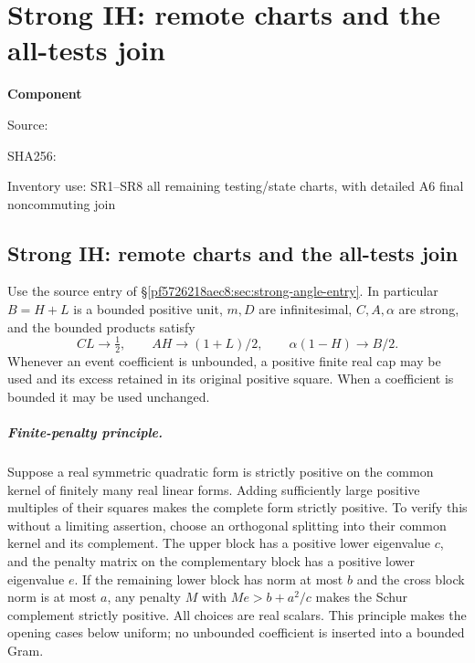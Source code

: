 \chapter{Strong IH: remote charts and the all-tests join}
\label{component:p7405dbf89341}
\noindent\textbf{Component }\par
{\small\noindent Source: \par}
{\small\noindent SHA256: \par}
{\small\noindent Inventory use: SR1--SR8 all remaining testing/state charts, with detailed A6 final noncommuting join\par}
\medskip
\section{Strong IH: remote charts and the all-tests join}
\label{p7405dbf89341:sec:strong-ih-remote}
Use the source entry of \S\ref{pf5726218aec8:sec:strong-angle-entry}. In particular
$B=H+L$ is a bounded positive unit, $m,D$ are infinitesimal,
$C,A,\alpha$ are strong, and the bounded products satisfy
\[
 CL\to\tfrac12,\qquad AH\to(1+L)/2,
 \qquad\alpha(1-H)\to B/2.
\tag{SR1}
\]
Whenever an event coefficient is unbounded, a positive finite real cap
may be used and its excess retained in its original positive square.
When a coefficient is bounded it may be used unchanged.

\paragraph{Finite-penalty principle.}
Suppose a real symmetric quadratic form is strictly positive on the
common kernel of finitely many real linear forms. Adding sufficiently
large positive multiples of their squares makes the complete form
strictly positive. To verify this without a limiting assertion, choose
an orthogonal splitting into their common kernel and its complement.
The upper block has a positive lower eigenvalue $c$, and the penalty
matrix on the complementary block has a positive lower eigenvalue
$e$. If the remaining lower block has norm at most $b$ and the cross
block norm is at most $a$, any penalty $M$ with $Me>b+a^2/c$ makes the
Schur complement strictly positive. All choices are real scalars.
This principle makes the opening cases below uniform; no unbounded
coefficient is inserted into a bounded Gram.

